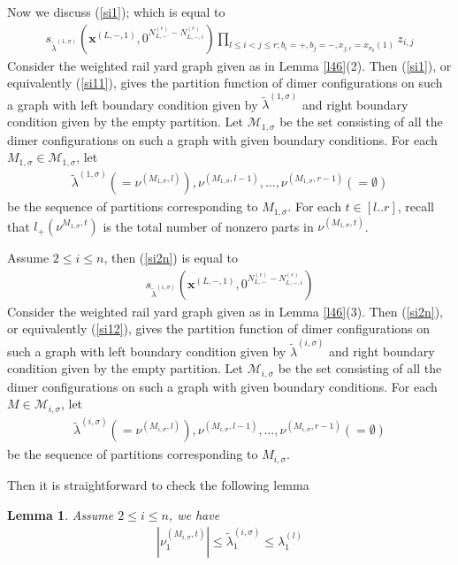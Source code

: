 \documentclass[11pt]{amsart}
\theoremstyle{plain}
\newtheorem{lemma}[theorem]{Lemma}
\theoremstyle{definition}
\theoremstyle{remark}
\newcommand\si{\sigma}
\numberwithin{equation}{section}
\numberwithin{theorem}{section}
\numberwithin{figure}{section}
\begin{document}
Now we discuss (\ref{si1}); which is equal to
\begin{align}
s_{\tilde{\lambda}^{(1,\sigma)}}\left(\mathbf{x}^{(L,-,1)},0^{N_{L,-}^{(\epsilon)}-N_{L,-,i}^{(\epsilon)}}\right)\prod_{l\leq i<j\leq r;b_i=+,b_j=-,x_{j,\epsilon}=x_{\si_0}(1)}z_{i,j}\label{si11}
\end{align}
Consider the weighted rail yard graph given as in Lemma \ref{l46}(2). Then (\ref{si1}), or equivalently (\ref{si11}), gives the partition function of dimer configurations on such a graph with left boundary condition given by $\tilde{\lambda}^{(1,\si)}$ and right boundary condition given by the empty partition. Let $\mathcal{M}_{1,\si}$ be the set consisting of all the dimer configurations on such a graph with given boundary conditions. For each $M_{1,\si}\in \mathcal{M}_{1,\si}$, let
\begin{align*}
\tilde{\lambda}^{(1,\si)}(=\nu^{(M_{1,\si},l)}),\nu^{(M_{1,\si},l-1)},\ldots,\nu^{(M_{1,\si},r-1)}(=\emptyset)
\end{align*}
be the sequence of partitions corresponding to $M_{1,\si}$. For each $t\in [l..r]$, recall that $l_{+}(\nu^{M_{1,\si},t})$ is the total number of nonzero parts in $\nu^{(M_{1,\si},t)}$. 

Assume $2\leq i\leq n$, then (\ref{si2n}) is equal to
\begin{align}
s_{\tilde{\lambda}^{(i,\sigma)}}\left(\mathbf{x}^{(L,-,1)},0^{N_{L,-}^{(\epsilon)}-N_{L,-,i}^{(\epsilon)}}\right)\label{si12}
\end{align}
Consider the weighted rail yard graph given as in Lemma \ref{l46}(3). Then (\ref{si2n}), or equivalently (\ref{si12}), gives the partition function of dimer configurations on such a graph with left boundary condition given by $\tilde{\lambda}^{(i,\si)}$ and right boundary condition given by the empty partition. Let $\mathcal{M}_{i,\si}$ be the set consisting of all the dimer configurations on such a graph with given boundary conditions. For each $M\in \mathcal{M}_{i,\si}$, let
\begin{align*}
\tilde{\lambda}^{(i,\si)}(=\nu^{(M_{i,\si},l)}),\nu^{(M_{i,\si},l-1)},\ldots,\nu^{(M_{i,\si},r-1)}(=\emptyset)
\end{align*}
be the sequence of partitions corresponding to $M_{i,\si}$. %






Then it is straightforward to check the following lemma
\begin{lemma}\label{le409}Assume $2\leq i\leq n$, we have
\begin{align*}
\left|\nu^{(M_{i,\si},t)}_1\right|\leq \tilde{\lambda}^{(i,\si)}_1\leq \lambda^{(l)}_1
\end{align*}
\end{lemma}
\end{document}
